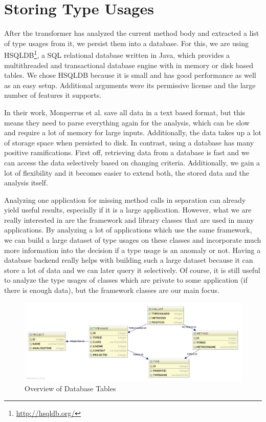 \section{Storing Type Usages}

After the transformer has analyzed the current method body and extracted a list of type usages from it, we persist them into a database.
For this, we are using HSQLDB\footnote{\url{http://hsqldb.org/}}, a SQL relational database written in Java, which provides a multithreaded and transactional database engine with in memory or disk based tables.
We chose HSQLDB because it is small and has good performance as well as an easy setup.
Additional arguments were its permissive license and the large number of features it supports.

In their work, Monperrus et al. save all data in a text based format, but this means they need to parse everything again for the analysis, which can be slow and require a lot of memory for large inputs.
Additionally, the data takes up a lot of storage space when persisted to disk.
In contrast, using a database has many positive ramifications.
First off, retrieving data from a database is fast and we can access the data selectively based on changing criteria.
Additionally, we gain a lot of flexibility and it becomes easier to extend both, the stored data and the analysis itself.

Analyzing one application for missing method calls in separation can already yield useful results, especially if it is a large application.
However, what we are really interested in are the framework and library classes that are used in many applications.
By analyzing a lot of applications which use the same framework, we can build a large dataset of type usages on these classes and incorporate much more information into the decision if a type usage is an anomaly or not.
Having a database backend really helps with building such a large dataset because it can store a lot of data and we can later query it selectively.
Of course, it is still useful to analyze the type usages of classes which are private to some application (if there is enough data), but the framework classes are our main focus.

\begin{figure}[h]
    \centering
    \includegraphics[width=\textwidth]{figures/database_layout-light}
    \caption{Overview of Database Tables}
    \label{fig:db_layout}
\end{figure}

